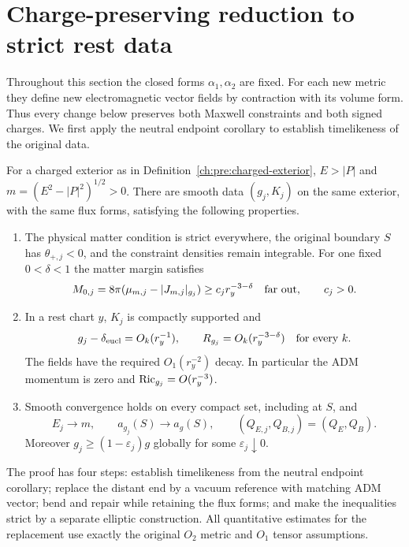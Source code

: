 \section{Charge-preserving reduction to strict rest data}
\label{ch:rest:section}

Throughout this section the closed forms $\alpha_1,\alpha_2$ are fixed.
For each new metric they define new electromagnetic vector fields by
contraction with its volume form. Thus every change below preserves both
Maxwell constraints and both signed charges. We first apply the
neutral endpoint corollary to establish timelikeness of the original data.

\begin{proposition}
\label{ch:rest:reduction}
For a charged exterior as in Definition~\ref{ch:pre:charged-exterior}, $E>|P|$ and
$m=(E^2-|P|^2)^{1/2}>0$. There are smooth data $(g_j,K_j)$ on the same
exterior, with the same flux forms, satisfying the following properties.
\begin{enumerate}
\item The physical matter condition is strict everywhere, the original
boundary $S$ has $\theta_{+,j}<0$, and the constraint densities remain
integrable. For one fixed $0<\delta<1$ the matter margin satisfies
\[
 M_{0,j}=8\pi(\mu_{m,j}-|J_{m,j}|_{g_j})
       \ge c_j r_y^{-3-\delta}\quad\hbox{far out},\qquad c_j>0.
\]
\item In a rest chart $y$, $K_j$ is compactly supported and
\[
 g_j-\delta_{\mathrm{eucl}}=O_k(r_y^{-1}),\qquad
 R_{g_j}=O_k(r_y^{-3-\delta})\quad\hbox{for every }k.
\]
The fields have the required $O_1(r_y^{-2})$ decay. In particular the
ADM momentum is zero and $\operatorname{Ric}_{g_j}=O(r_y^{-3})$.
\item Smooth convergence holds on every compact set, including at $S$,
and
\begin{equation}
 \label{ch:rest:limits}
 E_j\longrightarrow m,\qquad
 a_{g_j}(S)\longrightarrow a_g(S),\qquad
 (Q_{E,j},Q_{B,j})=(Q_E,Q_B).
\end{equation}
Moreover $g_j\ge(1-\varepsilon_j)g$ globally for some
$\varepsilon_j\downarrow0$.
\end{enumerate}
\end{proposition}

The proof has four steps: establish timelikeness from the neutral
endpoint corollary; replace the distant end by a vacuum reference with
matching ADM vector; bend and repair while retaining the flux forms;
and make the inequalities strict by a separate elliptic construction.
All quantitative estimates for the replacement use exactly the original
$O_2$ metric and $O_1$ tensor assumptions.

